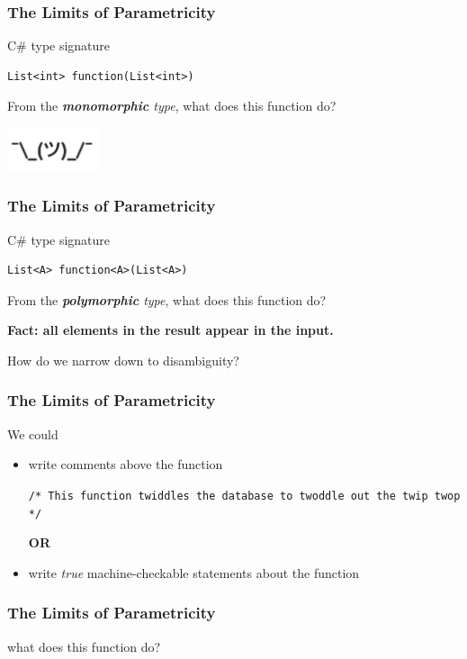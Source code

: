 \begin{frame}[fragile]
\frametitle{The Limits of Parametricity}
\begin{block}{C\# type signature}
\begin{lstlisting}[style=csharp]
List<int> function(List<int>)
\end{lstlisting}
From the \emph{\textbf{monomorphic} type}, what does this function do?
\end{block}
\includegraphics[width=0.2\textwidth]{image/shrug.png}
\end{frame}

\begin{frame}[fragile]
\frametitle{The Limits of Parametricity}
\begin{block}{C\# type signature}
\begin{lstlisting}[style=csharp]
List<A> function<A>(List<A>)
\end{lstlisting}
From the \emph{\textbf{polymorphic} type}, what does this function do?
\end{block}
\large{\textbf{Fact: all elements in the result appear in the input.}}

\tiny{How do we narrow down to disambiguity?}
\end{frame}

\begin{frame}[fragile]
\frametitle{The Limits of Parametricity}
\begin{block}{We could}
\begin{itemize}
  \item<1-> write comments above the function

            \lstinline[style=csharp]{/* This function twiddles the database to twoddle out the twip twop */}

            \textbf{OR}
  \item<2-> write \emph{true} machine-checkable statements about the function
\end{itemize}
\end{block}
\end{frame}

\begin{frame}[fragile]
\frametitle{The Limits of Parametricity}
\begin{block}{what does this function do?}

\end{block}
\end{frame}

